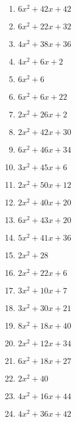 \documentclass[9pt,dvipdfmx,a4paper]{article}
\begin{document}
\begin{multicols}{2}
\begin{enumerate}
\item
$ 6 x^{2} + 42 x + 42$

\item
$ 6 x^{2} + 22 x + 32$

\item
$ 4 x^{2} + 38 x + 36$

\item
$ 4 x^{2} + 6 x + 2$

\item
$ 6 x^{2} + 6$

\item
$ 6 x^{2} + 6 x + 22$

\item
$ 2 x^{2} + 26 x + 2$

\item
$ 2 x^{2} + 42 x + 30$

\item
$ 6 x^{2} + 46 x + 34$

\item
$ 3 x^{2} + 45 x + 6$

\item
$ 2 x^{2} + 50 x + 12$

\item
$ 2 x^{2} + 40 x + 20$

\item
$ 6 x^{2} + 43 x + 20$

\item
$ 5 x^{2} + 41 x + 36$

\item
$ 2 x^{2} + 28$

\item
$ 2 x^{2} + 22 x + 6$

\item
$ 3 x^{2} + 10 x + 7$

\item
$ 3 x^{2} + 30 x + 21$

\item
$ 8 x^{2} + 18 x + 40$

\item
$ 2 x^{2} + 12 x + 34$

\item
$ 6 x^{2} + 18 x + 27$

\item
$ 2 x^{2} + 40$

\item
$ 4 x^{2} + 16 x + 44$

\item
$ 4 x^{2} + 36 x + 42$


\end{enumerate}
\end{multicols}
\end{document}
